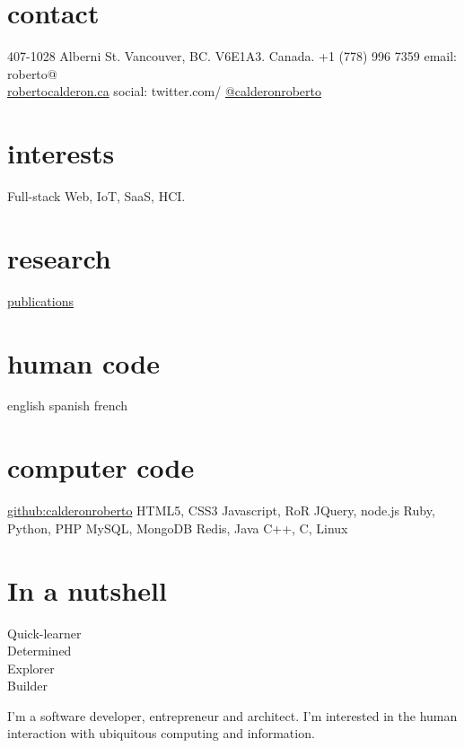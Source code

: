 \documentclass[full]{rvca}
\begin{document}
 
\begin{aside} %
\section{contact}
407-1028 Alberni St.
Vancouver, BC.
V6E1A3. Canada.
+1 (778) 996 7359
email: roberto@\\\href{http://robertocalderon.ca}{robertocalderon.ca}
social: twitter.com/
\href{http://twitter.com/calderonroberto}{@calderonroberto}
% 
\QrCode
\section{interests}
Full-stack Web, IoT, SaaS, HCI.
% 
\section{research}
\href{http://robertocalderon.ca/content.php?c=publications}{publications}
% 
\section{human code}
english
spanish
french
\section{computer code}
\href{https://github.com/calderonroberto}{github:calderonroberto}
HTML5, CSS3
Javascript, RoR
JQuery, node.js
Ruby, Python, PHP
MySQL, MongoDB
Redis, Java
C++, C, Linux
% 
\section{In a nutshell}
Quick-learner\\Determined\\Explorer\\Builder
\end{aside}
 
\begin{statement}
I'm a software developer, entrepreneur and architect. I'm interested in the human interaction with ubiquitous computing and information.
\end{statement}
\end{document}
